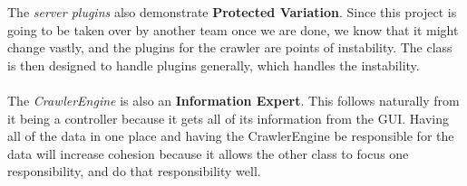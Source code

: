 \documentclass{article}
\begin{document}
The \emph{server plugins} also demonstrate \textbf{Protected Variation}. Since this project is going to be taken over by another team once we are done, we know that it might change vastly, and the plugins for the crawler are points of instability. The class is then designed to handle plugins generally, which handles the instability.\\\\
The \emph{CrawlerEngine} is also an \textbf{Information Expert}. This follows naturally from it being a controller because it gets all of its information from the GUI. Having all of the data in one place and having the CrawlerEngine be responsible for the data will increase cohesion because it allows the other class to focus one responsibility, and do that responsibility well.\\\\
\end{document}
